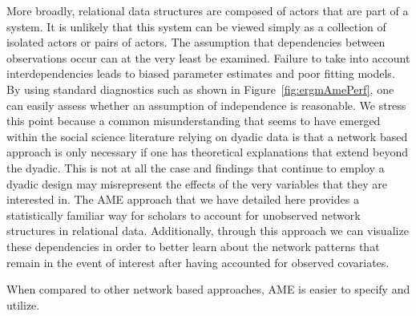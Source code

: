 \documentclass[12pt,pdflatex]{elsarticle}
\newcommand{\pkg}[1]{{\fontseries{b}\selectfont #1}}
\begin{document}
More broadly, relational data structures are composed of actors that are part of a system. It is unlikely that this system can be viewed simply as a collection of isolated actors or pairs of actors. The assumption  that dependencies between observations occur can at the very least be examined. Failure to take into account interdependencies leads to biased parameter estimates and poor fitting models. By using standard diagnostics such as shown in Figure~\ref{fig:ergmAmePerf}, one can easily assess whether an assumption of independence is reasonable. We stress this point because a common misunderstanding that seems to have emerged within the social science literature relying on dyadic data is that a network based approach is only necessary if one has theoretical explanations that extend beyond the dyadic. This is not at all the case and findings that continue to employ a dyadic design may misrepresent the effects of the very variables that they are interested in. The AME approach that we have detailed here provides a statistically familiar way for scholars to account for unobserved network structures in relational data. Additionally, through this approach we can visualize these dependencies in order to better learn about the network patterns that remain in the event of interest after having accounted for observed covariates.

When compared to other network based approaches, AME is easier to specify and utilize. 


\newpage

\clearpage

% 
\newpage
\end{document}
